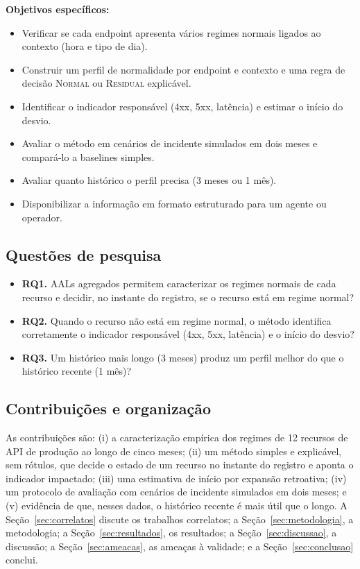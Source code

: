 \documentclass[sigconf,nonacm]{acmart}
\newcommand{\Normal}{\textsc{Normal}\xspace}
\newcommand{\Residual}{\textsc{Residual}\xspace}
\begin{document}
\textbf{Objetivos específicos:}
\begin{itemize}
  \item Verificar se cada endpoint apresenta vários regimes normais ligados ao contexto (hora e tipo de dia).
  \item Construir um perfil de normalidade por endpoint e contexto e uma regra de decisão \Normal ou \Residual explicável.
  \item Identificar o indicador responsável (4xx, 5xx, latência) e estimar o início do desvio.
  \item Avaliar o método em cenários de incidente simulados em dois meses e compará-lo a baselines simples.
  \item Avaliar quanto histórico o perfil precisa (3 meses ou 1 mês).
  \item Disponibilizar a informação em formato estruturado para um agente ou operador.
\end{itemize}

\subsection{Questões de pesquisa}
\begin{itemize}
  \item \textbf{RQ1.} AALs agregados permitem caracterizar os regimes normais de cada recurso e decidir, no instante do registro, se o recurso está em regime normal?
  \item \textbf{RQ2.} Quando o recurso não está em regime normal, o método identifica corretamente o indicador responsável (4xx, 5xx, latência) e o início do desvio?
  \item \textbf{RQ3.} Um histórico mais longo (3 meses) produz um perfil melhor do que o histórico recente (1 mês)?
\end{itemize}

\subsection{Contribuições e organização}
As contribuições são: (i) a caracterização empírica dos regimes de 12 recursos de API de produção ao longo de cinco meses; (ii) um método simples e explicável, sem rótulos, que decide o estado de um recurso no instante do registro e aponta o indicador impactado; (iii) uma estimativa de início por expansão retroativa; (iv) um protocolo de avaliação com cenários de incidente simulados em dois meses; e (v) evidência de que, nesses dados, o histórico recente é mais útil que o longo. A Seção~\ref{sec:correlatos} discute os trabalhos correlatos; a Seção~\ref{sec:metodologia}, a metodologia; a Seção~\ref{sec:resultados}, os resultados; a Seção~\ref{sec:discussao}, a discussão; a Seção~\ref{sec:ameacas}, as ameaças à validade; e a Seção~\ref{sec:conclusao} conclui.
\end{document}
